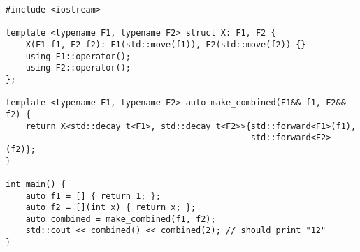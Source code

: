 \begin{lstlisting}[title=\href{https://godbolt.org/z/dmBP8E}{\texttt{godbolt.org/z/dmBP8E}}]
#include <iostream>

template <typename F1, typename F2> struct X: F1, F2 {
    X(F1 f1, F2 f2): F1(std::move(f1)), F2(std::move(f2)) {}
    using F1::operator();
    using F2::operator();
};

template <typename F1, typename F2> auto make_combined(F1&& f1, F2&& f2) {
    return X<std::decay_t<F1>, std::decay_t<F2>>{std::forward<F1>(f1),
                                                 std::forward<F2>(f2)};
}

int main() {
    auto f1 = [] { return 1; };
    auto f2 = [](int x) { return x; };
    auto combined = make_combined(f1, f2);
    std::cout << combined() << combined(2); // should print "12"
}
\end{lstlisting}
